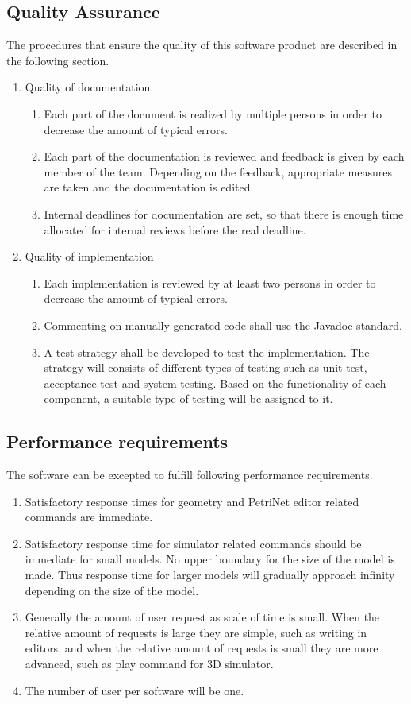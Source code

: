 \subsection{Quality Assurance}
The procedures that ensure the quality of this software product are described in the following section.
\begin{enumerate}
	\item Quality of documentation
	\begin{enumerate}
		\item Each part of the document is realized by multiple persons in order to decrease the amount of typical errors.
		\item Each part of the documentation is reviewed and feedback is given by each member of the team. Depending on the feedback, appropriate measures are taken and the documentation is edited.
		\item Internal deadlines for documentation are set, so that there is enough time allocated for internal reviews before the real deadline.
	\end{enumerate}
	\item Quality of implementation
	\begin{enumerate}
		\item Each implementation is reviewed by at least two persons in order to decrease the amount of typical errors.
		\item Commenting on manually generated code shall use the Javadoc standard.
		\item A test strategy shall be developed to test the implementation. The strategy will consists of different types of testing such as unit test, acceptance test and system testing. Based on the functionality of each component, a suitable type of testing will be assigned to it. 
	\end{enumerate}
\end{enumerate}

\subsection{Performance requirements}
The software can be excepted to fulfill following performance requirements.
\begin{enumerate}
	\item Satisfactory response times for geometry and PetriNet editor related commands are immediate.
	\item Satisfactory response time for simulator related commands should be immediate for small models. No upper boundary for the size of the model is made. Thus response time for larger models will gradually approach infinity depending on the size of the model.
	\item Generally the amount of user request as scale of time is small. When the relative amount of requests is large they are simple, such as writing in editors, and when the relative amount of requests is small they are more advanced, such as play command for 3D simulator.
	\item The number of user per software will be one.
\end{enumerate}